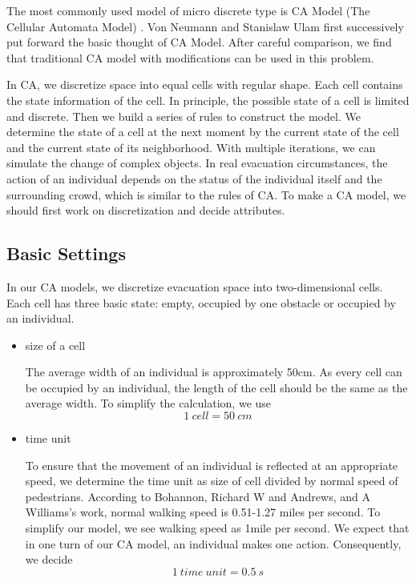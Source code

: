 \documentclass{mcmthesis}
\begin{document}
The most commonly used model of micro discrete type is CA Model (The Cellular Automata Model) . \cite{92} Von Neumann and Stanislaw Ulam first successively put forward the basic thought of CA Model. After careful comparison, we find that traditional CA model with modifications can be used in this problem.

In CA, we discretize space into equal cells with regular shape. Each cell contains the state information of the cell. In principle, the possible state of a cell is limited and discrete. Then we build a series of rules to construct the model. We determine the state of a cell at the next moment by the current state of the cell and the current state of its neighborhood. With multiple iterations, we can simulate the change of complex objects. In real evacuation circumstances, the action of an individual depends on the status of the individual itself and the surrounding crowd, which is similar to the rules of CA. \cite{32} \cite{60} To make a CA model, we should first work on discretization and decide attributes.

\subsection{Basic Settings}
In our CA models, we discretize evacuation space into two-dimensional cells. Each cell has three basic state: empty, occupied by one obstacle or occupied by an individual. 

\begin{itemize}
\item  size of a cell 

The average width of an individual is approximately 50cm. As every cell can be occupied by an individual, the length of the cell should be the same as the average width. To simplify the
calculation, we use
\begin{equation*}
1\ cell= 50\ cm
\end{equation*}
\item  time unit

To ensure that the movement of an individual is reflected at an appropriate speed, we determine the time unit as size of cell divided by normal speed of pedestrians. According to Bohannon, Richard W and Andrews, and A Williams’s work, normal walking speed is 0.51-1.27 miles per second. To simplify our model, we see walking speed as 1mile per second. We expect that in one turn of our CA model, an individual makes one action. Consequently, we decide 
\begin{equation*} 
	1\ time\ unit = 0.5\ s
\end{equation*}
\end{itemize}
\end{document}
